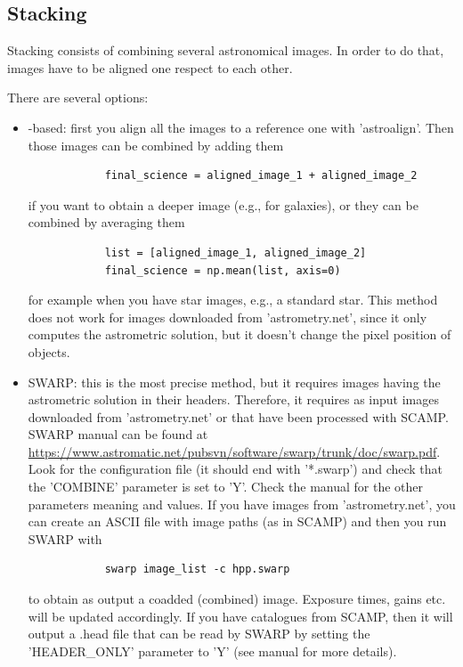 \documentclass[a4paper, 11pt, fleqn]{memoir}
\begin{document}
\subsection{Stacking}

Stacking consists of combining several astronomical images.
In order to do that, images have to be aligned one respect to each other.

There are several options:
\begin{itemize}
    \item
          -based: first you align all the images to a reference one with 'astroalign'.
          Then those images can be combined by adding them
          \begin{verbatim}
            final_science = aligned_image_1 + aligned_image_2
          \end{verbatim}
          if you want to obtain a deeper image (e.g., for galaxies), or they can be combined by averaging them
          \begin{verbatim}
            list = [aligned_image_1, aligned_image_2]
            final_science = np.mean(list, axis=0)
          \end{verbatim}
          for example when you have star images, e.g., a standard star.
          This method does not work for images downloaded from 'astrometry.net', since it only computes the astrometric solution, but it doesn't change the pixel position of objects.
    \item
          SWARP: this is the most precise method, but it requires images having the
          astrometric solution in their headers.
          Therefore, it requires as input images downloaded from 'astrometry.net' or that have been processed with SCAMP.
          SWARP manual can be found at \url{https://www.astromatic.net/pubsvn/software/swarp/trunk/doc/swarp.pdf}.
          Look for the configuration file (it should end with '*.swarp') and check that the 'COMBINE' parameter is set to 'Y'.
          Check the manual for the other parameters meaning and values.
          If you have images from 'astrometry.net', you can create an ASCII file with image paths (as in SCAMP) and then you run SWARP with
          \begin{verbatim}
            swarp image_list -c hpp.swarp
          \end{verbatim}
          to obtain as output a coadded (combined) image.
          Exposure times, gains etc. will be updated accordingly.
          If you have catalogues from SCAMP, then it will output a .head file that can be read by SWARP by setting the 'HEADER\_ONLY' parameter to 'Y' (see manual for more details).
\end{itemize}
\end{document}
